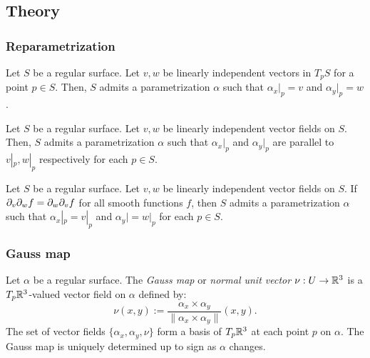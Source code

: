 \documentclass{../exp}
\def\a{\alpha}
\begin{document}
\subsection{Theory}

\subsubsection{Reparametrization}


\begin{thm}
Let $S$ be a regular surface.
Let $v,w$ be linearly independent vectors in $T_pS$ for a point $p\in S$.
Then, $S$ admits a parametrization $\a$ such that $\a_x|_p=v$ and $\a_y|_p=w$.
\end{thm}
\begin{thm}
Let $S$ be a regular surface.
Let $v,w$ be linearly independent vector fields on $S$.
Then, $S$ admits a parametrization $\a$ such that $\a_x|_p$ and $\a_y|_p$ are parallel to $v|_p,w|_p$ respectively for each $p\in S$.
\end{thm}
\begin{thm}
Let $S$ be a regular surface.
Let $v,w$ be linearly independent vector fields on $S$.
If $\pd_v\pd_wf=\pd_w\pd_vf$ for all smooth functions $f$, then $S$ admits a parametrization $\a$ such that $\a_x|_p=v|_p$ and $\a_y|=w|_p$ for each $p\in S$.
\end{thm}


\subsubsection{Gauss map}

\begin{defn}
Let $\a$ be a regular surface.
The \emph{Gauss map} or \emph{normal unit vector} $\nu:U\to\R^3$ is a $T_p\mathbb{R}^3$-valued vector field on $\a$ defined by:
\[\nu(x,y):=\frac{\a_x\times \a_y}{\|\a_x\times \a_y\|}(x,y).\]
The set of vector fields $\{\a_x,\a_y,\nu\}$ form a basis of $T_p\mathbb{R}^3$ at each point $p$ on $\a$.
The Gauss map is uniquely determined up to sign as $\a$ changes.
\end{defn}
\end{document}
